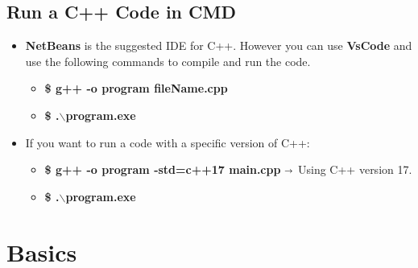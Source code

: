 \documentclass[12pt , a4paper]{article}
\newcommand{\hl}[1]{\colorbox{coolblack}{\color{cream}\textbf{#1}\color{black}}}
\newcommand{\bs}{$\backslash$}
\begin{document}
	\subsection{Run a C++ Code in CMD}
		\begin{itemize}
			\item \textbf{NetBeans} is the suggested IDE for C++. However you can use \textbf{VsCode} and use the following commands to compile and run the code.
			\begin{itemize}
				\item \hl{\$ g++ -o program fileName.cpp} \\
				\item \hl{\$ .\bs program.exe}\\
			\end{itemize}
			\item If you want to run a code with a specific version of C++:
			\begin{itemize}
				\item \hl{\$ g++ -o program -std=c++17 main.cpp} $\shortrightarrow$ Using C++ version 17. \\
				\item \hl{\$ .\bs program.exe}\\
			\end{itemize}

		\end{itemize}

\newpage
%
%

\section{Basics}

\end{document}
